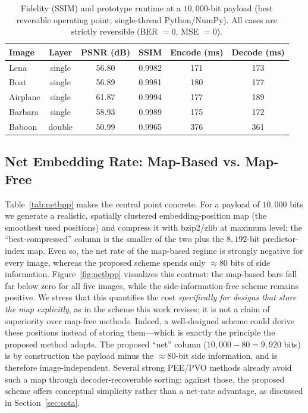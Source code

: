 \documentclass[journal,article,submit,pdftex,moreauthors]{Definitions/mdpi}
\begin{document}
\begin{table}[t]
\centering
\caption{Fidelity (SSIM) and prototype runtime at a $10{,}000$-bit payload (best reversible operating point; single-thread Python/NumPy). All cases are strictly reversible (BER $=0$, MSE $=0$).}
\label{tab:ssim}
\begin{tabular}{l c c c c c}
\hline
Image & Layer & PSNR (dB) & SSIM & Encode (ms) & Decode (ms) \\
\hline
Lena     & single & 56.80 & 0.9982 & 171 & 173 \\
Boat     & single & 56.89 & 0.9981 & 180 & 177 \\
Airplane & single & 61.87 & 0.9994 & 177 & 189 \\
Barbara  & single & 58.93 & 0.9989 & 175 & 172 \\
Baboon   & double & 50.99 & 0.9965 & 376 & 361 \\
\hline
\end{tabular}
\end{table}

\subsection{Net Embedding Rate: Map-Based vs. Map-Free}\label{sec:netexp}
Table~\ref{tab:netbpp} makes the central point concrete. For a payload of $10{,}000$ bits we generate a realistic, spatially clustered embedding-position map (the smoothest used positions) and compress it with bzip2/zlib at maximum level; the ``best-compressed'' column is the smaller of the two plus the $8{,}192$-bit predictor-index map. Even so, the net rate of the map-based regime is strongly negative for every image, whereas the proposed scheme spends only $\approx80$ bits of side information. Figure~\ref{fig:netbpp} visualizes this contrast: the map-based bars fall far below zero for all five images, while the side-information-free scheme remains positive. We stress that this quantifies the cost \emph{specifically for designs that store the map explicitly}, as in the scheme this work revises; it is not a claim of superiority over map-free methods. Indeed, a well-designed scheme could derive these positions instead of storing them---which is exactly the principle the proposed method adopts. The proposed ``net'' column ($10{,}000-80=9{,}920$ bits) is by construction the payload minus the $\approx80$-bit side information, and is therefore image-independent. Several strong PEE/PVO methods already avoid such a map through decoder-recoverable sorting; against those, the proposed scheme offers conceptual simplicity rather than a net-rate advantage, as discussed in Section~\ref{sec:sota}.
\end{document}
